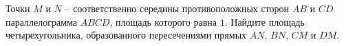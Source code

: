 \begin{ex}
	\begin{condition}
		Точки \( M  \) и \( N \) – соответственно середины противоположных сторон \( AB  \) и \( CD  \) параллелограмма \( ABCD \), площадь	которого равна \( 1 \). Найдите площадь четырехугольника, образованного пересечениями прямых \( AN \), \( BN \), \( CM  \) и \( DM \).
	\end{condition}
\end{ex}